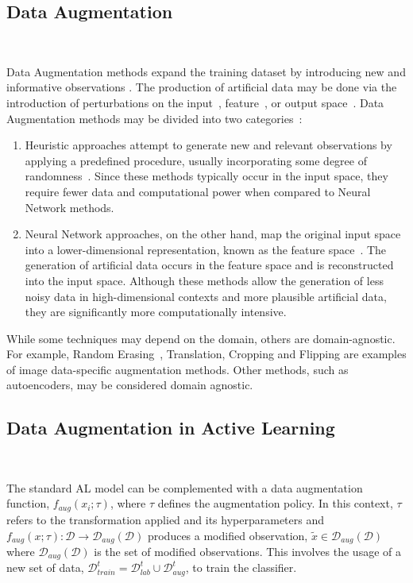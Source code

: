 \documentclass[parskip=full]{scrartcl}
\begin{document}
\subsection{Data Augmentation}~\label{sec:data_augmentation}

Data Augmentation methods expand the training dataset by introducing new and
informative observations \cite{Behpour2019}. The production of artificial data
may be done via the introduction of perturbations on the
input~\cite{fonseca2021improving}, feature~\cite{DeVries2017}, or output
space~\cite{Behpour2019}. Data Augmentation methods may be divided into two
categories~\cite{Shorten2019}:

\begin{enumerate}
    \item Heuristic approaches attempt to generate new and relevant
        observations by applying a predefined procedure, usually incorporating
        some degree of randomness~\cite{Kashefi2020}. Since these methods
        typically occur in the input space, they require fewer data and
        computational power when compared to Neural Network methods. 
    \item Neural Network approaches, on the other hand, map the original input
        space into a lower-dimensional representation, known as the feature
        space~\cite{DeVries2017}. The generation of artificial data occurs in
        the feature space and is reconstructed into the input space. Although
        these methods allow the generation of less noisy data in
        high-dimensional contexts and more plausible artificial data, they are
        significantly more computationally intensive. 
\end{enumerate}

While some techniques may depend on the domain, others are domain-agnostic.
For example, Random Erasing~\cite{Zhong2020}, Translation, Cropping and
Flipping are examples of image data-specific augmentation methods. Other
methods, such as autoencoders, may be considered domain agnostic.

\subsection{Data Augmentation in Active Learning
}~\label{sec:data_augmentation_in_al}

The standard AL model can be complemented with a data augmentation function,
$f_{aug}(x_i;\tau)$, where $\tau$ defines the augmentation policy. In this
context, $\tau$ refers to the transformation applied and its hyperparameters
and $f_{aug}(x;\tau): \mathcal{D} \rightarrow \mathcal{D}_{aug}(\mathcal{D})$
produces a modified observation, $\tilde{x} \in
\mathcal{D}_{aug}(\mathcal{D})$ where $\mathcal{D}_{aug}(\mathcal{D})$ is the
set of modified observations. This involves the usage of a new set of data,
$\mathcal{D}_{train}^t = \mathcal{D}_{lab}^t \cup \mathcal{D}_{aug}^t$, to
train the classifier.
\end{document}
